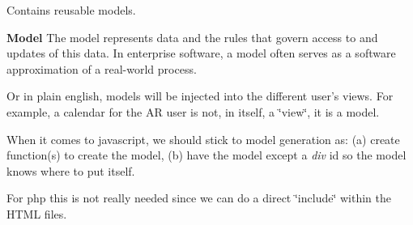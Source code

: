 Contains reusable models.

{\bfseries Model} The model represents data and the rules that govern access to and updates of this data. In enterprise software, a model often serves as a software approximation of a real-\/world process.

Or in plain english, models will be injected into the different user's views. For example, a calendar for the A\-R user is not, in itself, a \char`\"{}view\char`\"{}, it is a model.

When it comes to javascript, we should stick to model generation as\-: (a) create function(s) to create the model, (b) have the model except a {\itshape div} id so the model knows where to put itself.

For php this is not really needed since we can do a direct \char`\"{}include\char`\"{} within the H\-T\-M\-L files. 